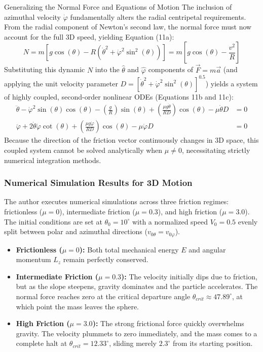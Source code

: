 \documentclass[11pt,letterpaper]{article}
\begin{document}
\begin{equationbreakdown}{Generalizing the Normal Force and Equations of Motion}
The inclusion of azimuthal velocity $\dot{\varphi}$ fundamentally alters the radial centripetal requirements. From the radial component of Newton's second law, the normal force must now account for the full 3D speed, yielding Equation (11a):
\begin{equation}\label{eq:normal_3d}
N = m\left[g\cos(\theta) - R(\dot{\theta}^2 + \dot{\varphi}^2\sin^2(\theta))\right] = m\left[g\cos(\theta) - \frac{v^2}{R}\right]
\end{equation}
Substituting this dynamic $N$ into the $\hat{\theta}$ and $\hat{\varphi}$ components of $\vec{F} = m\vec{a}$ (and applying the unit velocity parameter $D = [\dot{\theta}^2 + \dot{\varphi}^2\sin^2(\theta)]^{0.5}$) yields a system of highly coupled, second-order nonlinear ODEs (Equations 11b and 11c):
\begin{align}
\ddot{\theta} - \dot{\varphi}^2\sin(\theta)\cos(\theta) - \left(\frac{g}{R}\right)\sin(\theta) + \left(\frac{\mu g \dot{\theta}}{RD}\right)\cos(\theta) - \mu\dot{\theta}D &= 0 \\
\ddot{\varphi} + 2\dot{\theta}\dot{\varphi}\cot(\theta) + \left(\frac{\mu g \dot{\varphi}}{RD}\right)\cos(\theta) - \mu\dot{\varphi}D &= 0
\end{align}
Because the direction of the friction vector continuously changes in 3D space, this coupled system cannot be solved analytically when $\mu \neq 0$, necessitating strictly numerical integration methods.
\end{equationbreakdown}

\subsubsection{Numerical Simulation Results for 3D Motion}
The author executes numerical simulations across three friction regimes: frictionless ($\mu=0$), intermediate friction ($\mu=0.3$), and high friction ($\mu=3.0$). The initial conditions are set at $\theta_0 = 10^\circ$ with a normalized speed $V_0 = 0.5$ evenly split between polar and azimuthal directions ($v_{0\theta} = v_{0\varphi}$).
\begin{itemize}
    \item \textbf{Frictionless ($\mu=0$):} Both total mechanical energy $E$ and angular momentum $L_z$ remain perfectly conserved.
    \item \textbf{Intermediate Friction ($\mu=0.3$):} The velocity initially dips due to friction, but as the slope steepens, gravity dominates and the particle accelerates. The normal force reaches zero at the critical departure angle $\theta_{crit} \approx 47.89^\circ$, at which point the mass leaves the sphere.
    \item \textbf{High Friction ($\mu=3.0$):} The strong frictional force quickly overwhelms gravity. The velocity plummets to zero immediately, and the mass comes to a complete halt at $\theta_{crit} = 12.33^\circ$, sliding merely $2.3^\circ$ from its starting position.
\end{itemize}
\end{document}
